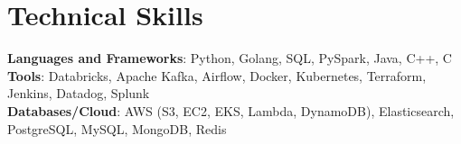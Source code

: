\documentclass[letterpaper,11pt]{article}
\begin{document}
%
\section{Technical Skills}
 \begin{itemize}[leftmargin=0.15in, label={}]
    \small{\item{
     \textbf{Languages and Frameworks}{: Python, Golang, SQL, PySpark, Java, C++, C} \\
     \textbf{Tools}{: Databricks, Apache Kafka, Airflow, Docker, Kubernetes, Terraform, Jenkins, Datadog, Splunk} \\
     \textbf{Databases/Cloud}{: AWS (S3, EC2, EKS, Lambda, DynamoDB), Elasticsearch, PostgreSQL, MySQL, MongoDB, Redis}
    }}
 \end{itemize}
 \vspace{-20pt}
\end{document}
